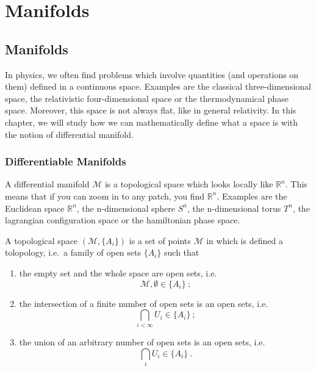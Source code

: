 \part{Manifolds}

\chapter{Manifolds}

    In physics, we often find problems which involve quantities (and operations on them) defined in a continuous space. Examples are the classical three-dimensional space, the relativistic four-dimensional space or the thermodynamical phase space. Moreover, this space is not always flat, like in general relativity. In this chapter, we will study how we can mathematically define what a space is with the notion of differential manifold.

\section{Differentiable Manifolds}

    A differential manifold $\mathcal M$ is a topological space which looks locally like $\mathbb R^n$. This means that if you can zoom in to any patch, you find $\mathbb R^n$. Examples are the Euclidean space $\mathbb R^n$, the n-dimensional sphere $S^n$, the n-dimensional torus $T^n$, the lagrangian configuration space or the hamiltonian phase space.

    \begin{definition}
        A topological space $(\mathcal M, \{A_i\})$ is a set of points $\mathcal M$ in which is defined a tolopology, i.e.~a family of open sets $\{A_i\}$ such that 
    \begin{enumerate}
        \item the empty set and the whole space are open sets, i.e.
            \begin{equation*}
                \mathcal M, \emptyset \in \{A_i\} ~;
            \end{equation*}
        \item the intersection of a finite number of open sets is an open sets, i.e.
            \begin{equation*}
                \bigcap_{i<\infty} U_i \in \{A_i\} ~;
            \end{equation*}
        \item the union of an arbitrary number of open sets is an open sets, i.e.
            \begin{equation*}
                \bigcap_{i} U_i \in \{A_i\} ~.
            \end{equation*}
    \end{enumerate}
    \end{definition}

